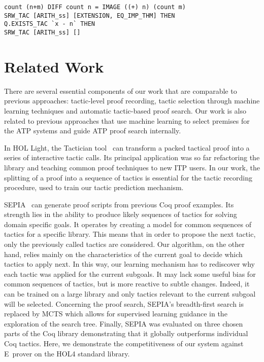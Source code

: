 \documentclass[runningheads,a4paper,draft]{svjour3}
\def\holfour{\textsf{HOL4}\xspace}
\def\hollight{\textsf{HOL Light}\xspace}
\def\coq{\textsf{Coq}\xspace}
\def\eprover{\textsf{E~prover}\xspace}
\begin{document}
\begin{example}\label{ex:cs4}
\begin{lstlisting}[language=SMLSmall]
count (n+m) DIFF count n = IMAGE ((+) n) (count m)
SRW_TAC [ARITH_ss] [EXTENSION, EQ_IMP_THM] THEN
Q.EXISTS_TAC `x - n` THEN
SRW_TAC [ARITH_ss] []
\end{lstlisting}
\end{example}


\section{Related Work}
There are several essential components of our work that are comparable to
previous approaches: tactic-level proof recording, tactic
selection through machine learning techniques and automatic tactic-based proof
search. Our work is also related to previous approaches that use machine
learning to select premises for the ATP systems and guide ATP proof search
internally.

In \hollight, the Tactician tool~\cite{DBLP:conf/sefm/Adams15}
can transform a packed tactical proof into a series of interactive tactic
calls. Its principal application
was so far refactoring the library and teaching common proof techniques to new
ITP users. In our work, the splitting of a proof into a sequence of tactics is
essential for the
tactic recording procedure, used to train our tactic prediction mechanism.

\textsf{SEPIA}~\cite{DBLP:conf/cade/GransdenWR15} can
generate
proof scripts from previous \coq proof examples.
Its strength lies in the ability to produce likely sequences
of tactics for solving domain specific goals. It operates by creating a model
for common sequences of tactics for a specific library.
This means that in order to propose the next tactic, only the previously
called tactics
are considered.
Our algorithm, on the other hand, relies mainly on the characteristics of the
current goal
to decide
which tactics to apply next. In this way, our learning mechanism has to
rediscover why each
tactic was applied for the current subgoals. It may lack some useful bias for
common sequences
of tactics, but is more reactive to subtle changes. Indeed, it can be trained
on a large library and only tactics relevant to the current subgoal will be
selected.
Concerning the proof search, \textsf{SEPIA}'s %
breadth-first search is replaced by MCTS which allows for supervised learning
guidance in the exploration of the search tree.
Finally, \textsf{SEPIA} was evaluated on three chosen parts of the
\coq library demonstrating that it globally outperforms individual \coq
tactics. Here, we demonstrate the competitiveness of our system against
\eprover on the \holfour standard library.
\end{document}
